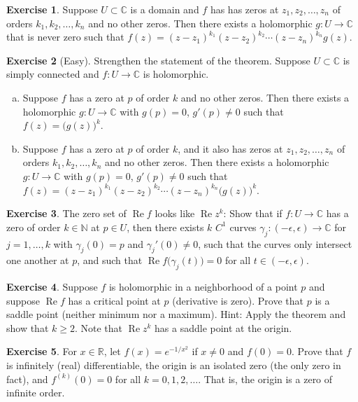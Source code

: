 \documentclass[12pt,openany]{book}
\renewcommand{\Re}{\operatorname{Re}}
\newcommand{\C}{{\mathbb{C}}}
\newcommand{\R}{{\mathbb{R}}}
\newcommand{\N}{{\mathbb{N}}}
\theoremstyle{plain}
\theoremstyle{remark}
\theoremstyle{definition}
\newenvironment{exbox}{%
    \def\FrameCommand{\vrule width 1pt \relax\hspace {10pt}}%
    \MakeFramed {\advance \hsize -\width \FrameRestore }%
}{%
    \endMakeFramed
}
\newenvironment{exparts}{%
    \leavevmode\begin{enumerate}[a),noitemsep,topsep=0pt,parsep=0pt,partopsep=0pt]
}{%
    \end{enumerate}
}
\theoremstyle{exercise}
\newtheorem{exercise}{Exercise}[section]
\theoremstyle{example}
\begin{document}
\begin{exbox}
\begin{exercise}
Suppose $U \subset \C$ is a domain and $f$ has
has zeros at $z_1, z_2, \ldots, z_n$ of
orders $k_1, k_2, \ldots, k_n$ and no other zeros.
Then there exists a holomorphic
$g \colon U \to \C$ that is never zero
such that $f(z) = {(z-z_1)}^{k_1}{(z-z_2)}^{k_2}\cdots{(z-z_n)}^{k_n} g(z).$
\end{exercise}

\begin{exercise}[Easy]
Strengthen the statement of the theorem.
Suppose $U \subset \C$ is simply connected and $f \colon U \to \C$
is holomorphic.
\begin{exparts}
\item
Suppose $f$ has a zero at $p$ of
order $k$ and no other zeros.
Then there exists a holomorphic
$g \colon U \to \C$ with $g(p) = 0$, $g'(p) \not= 0$
such that $f(z) = {\bigl( g(z) \bigr)}^k$.
\item
Suppose $f$ has a zero at $p$
of order $k$,
and it also has zeros at $z_1, z_2, \ldots, z_n$ of
orders $k_1, k_2, \ldots, k_n$ and no other zeros.
Then there exists a holomorphic
$g \colon U \to \C$ with $g(p) = 0$, $g'(p) \not= 0$
such that $f(z) = {(z-z_1)}^{k_1}{(z-z_2)}^{k_2}\cdots{(z-z_n)}^{k_n} {\bigl( g(z) \bigr)}^k$.
\end{exparts}
\end{exercise}

\begin{exercise}
The zero set of $\Re f$ looks like $\Re z^k$:
Show that if $f \colon U \to \C$ has a zero of order $k \in \N$ at $p \in
U$, then there exists $k$  $C^1$ curves
$\gamma_j \colon (-\epsilon, \epsilon) \to \C$ for
$j=1,\ldots,k$ with $\gamma_j(0) = p$
and $\gamma_j'(0) \not= 0$, such that the curves only intersect
one another
at $p$, and such that $\Re f\bigl( \gamma_j(t) \bigr) = 0$ for
all $t \in (-\epsilon,\epsilon)$.
\end{exercise}

\begin{exercise}
Suppose $f$ is holomorphic in a neighborhood of a point $p$
and suppose $\Re f$ has a critical point at $p$ (derivative is zero).
Prove that $p$ is a saddle point (neither minimum nor a maximum).
Hint: Apply the theorem and show that $k \geq 2$.  Note that $\Re z^k$ has a
saddle point at the origin.
\end{exercise}

\begin{exercise}
For $x \in \R$, let $f(x) = e^{-1/x^2}$ if $x \not=0$ and $f(0) = 0$.
Prove that $f$ is infinitely (real) differentiable, the origin is
an isolated zero (the only zero in fact), and $f^{(k)}(0) = 0$ for
all $k=0,1,2,\ldots$.  That is, the origin is a zero of infinite order.
\end{exercise}
\end{exbox}
\end{document}

